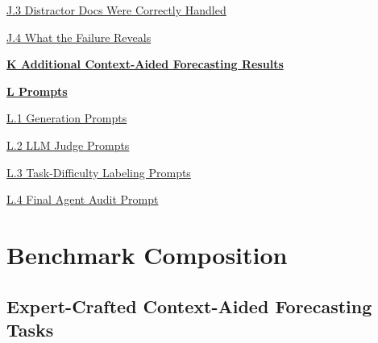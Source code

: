 \documentclass[]{servicenow}
\begin{document}
\hspace{0.5cm}\hyperref[appx:task216:distractors]{J.3 Distractor Docs Were Correctly Handled}
\dotfill \hyperref[appx:task216:distractors]{\pageref{appx:task216:distractors}}

\hspace{0.5cm}\hyperref[appx:task216:summary]{J.4 What the Failure Reveals}
\dotfill \hyperref[appx:task216:summary]{\pageref{appx:task216:summary}}

\textbf{\hyperref[appx:additional_caf_results]{K Additional Context-Aided Forecasting Results}}
\dotfill \hyperref[appx:additional_caf_results]{\pageref{appx:additional_caf_results}}

\textbf{\hyperref[appendix:prompts]{L Prompts}}
\dotfill \hyperref[appendix:prompts]{\pageref{appendix:prompts}}

\hspace{0.5cm}\hyperref[app:prompts-generation]{L.1 Generation Prompts}
\dotfill \hyperref[app:prompts-generation]{\pageref{app:prompts-generation}}

\hspace{0.5cm}\hyperref[app:prompts-judges]{L.2 LLM Judge Prompts}
\dotfill \hyperref[app:prompts-judges]{\pageref{app:prompts-judges}}

\hspace{0.5cm}\hyperref[app:prompts-difficulty]{L.3 Task-Difficulty Labeling Prompts}
\dotfill \hyperref[app:prompts-difficulty]{\pageref{app:prompts-difficulty}}

\hspace{0.5cm}\hyperref[app:prompts-audit]{L.4 Final Agent Audit Prompt}                      
\dotfill \hyperref[app:prompts-audit]{\pageref{app:prompts-audit}}
\noindent\makebox[\textwidth]{\rule{\textwidth}{0.4pt}}

\vspace{1em}

\clearpage
\section{Benchmark Composition}
\label{app:benchmark-composition}

\subsection{Expert-Crafted Context-Aided Forecasting Tasks}
\label{app:expert-motivation}
\end{document}
